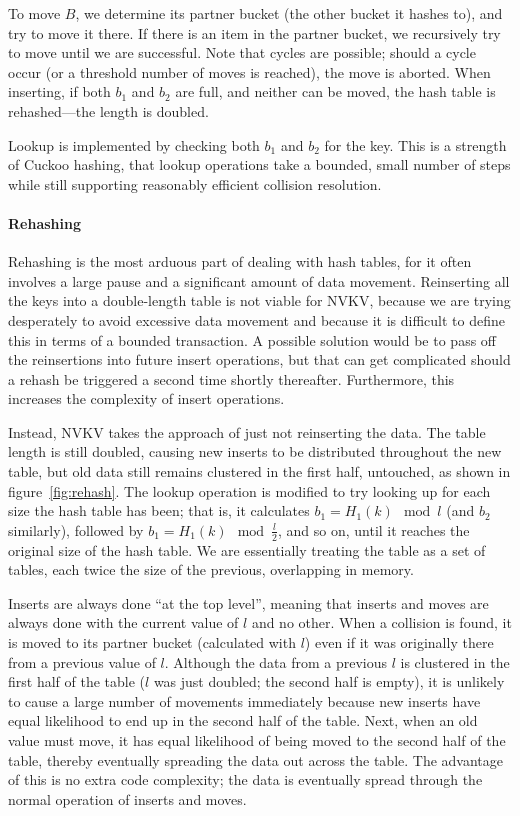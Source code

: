 To move $B$, we determine its partner bucket (the other bucket it hashes to),
and try to move it there. If there is an item in the partner bucket, we
recursively try to move until we are successful. Note that cycles are possible;
should a cycle occur (or a threshold number of moves is reached), the move is
aborted. When inserting, if both $b_1$ and $b_2$ are
full, and neither can be moved, the hash table is rehashed---the length is
doubled.

Lookup is implemented by checking both $b_1$ and $b_2$ for the key. This is a
strength of Cuckoo hashing, that lookup operations take a bounded, small number
of steps while still supporting reasonably efficient collision resolution.

\paragraph{Rehashing}

Rehashing is the most arduous part of dealing with hash tables, for it often
involves a large pause and a significant amount of data movement. Reinserting
all the keys into a double-length table is not viable for NVKV, because we are
trying desperately to avoid excessive data movement and because it is difficult
to define this in terms of a bounded transaction. A possible solution would be
to pass off the reinsertions into future insert operations, but that can get
complicated should a rehash be triggered a second time shortly thereafter.
Furthermore, this increases the complexity of insert operations.

Instead, NVKV takes the approach of just not reinserting the data. The table
length is still doubled, causing new inserts to be distributed throughout the
new table, but old data still remains clustered in the first half, untouched, as
shown in figure~\ref{fig:rehash}.
The lookup operation is modified to try looking up for each size the hash table
has been; that is, it calculates $b_1 = H_1(k) \mod l$ (and $b_2$ similarly),
followed by $b_1 = H_1(k) \mod \frac{l}{2}$, and so on, until it reaches the
original size of the hash table. We are essentially treating the table as a set
of tables, each twice the size of the previous, overlapping in memory.

Inserts are always done ``at the top level'', meaning that inserts and moves are always
done with the current value of $l$ and no other. When a collision is found, it
is moved to its partner bucket (calculated with $l$) even if it was originally
there from a previous value of $l$. Although the data from a previous $l$ is
clustered in the first half of the table ($l$ was just doubled; the second half
is empty), it is unlikely to cause a large number of movements immediately
because new inserts have equal likelihood to end up in the second half of the
table. Next, when an old value must move, it has equal likelihood of being moved
to the second half of the table, thereby eventually spreading the data out
across the table. The advantage of this is no extra code complexity; the data is
eventually spread through the normal operation of inserts and moves.



